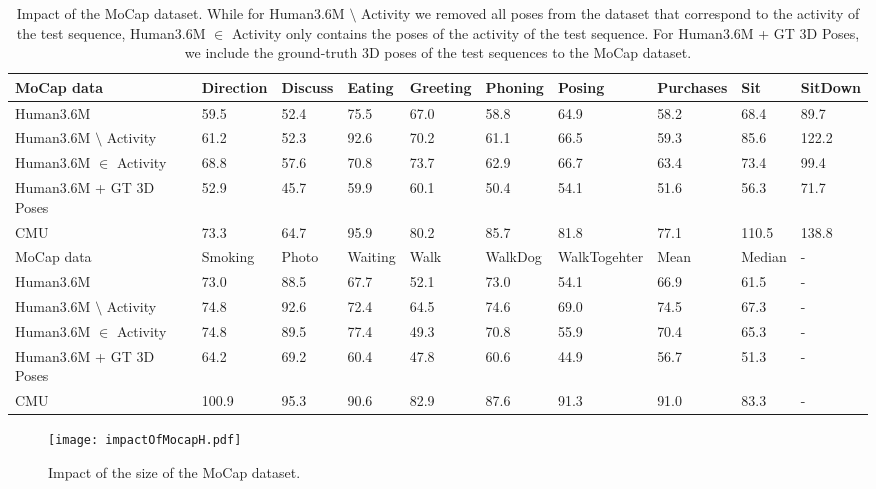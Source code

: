 \documentclass[10pt,journal,compsoc]{IEEEtran}
\begin{document}
\begin{table*}[!]
\centering
\begin{tabularx}{\linewidth}{lsssssssss}
\toprule \midrule
MoCap data 				& Direction		& Discuss		& Eating	& Greeting 		& Phoning 		& Posing		& Purchases 		& Sit 			& SitDown	\\
\midrule \midrule
Human3.6M				& 59.5			&52.4			&75.5		&67.0			&58.8			&64.9			&58.2			&68.4			& 89.7		\\	
Human3.6M  $\setminus$ Activity		& 61.2			&52.3			&92.6		&70.2			&61.1			&66.5			&59.3			&85.6			& 122.2		\\ 
Human3.6M  $\in$ Activity		& 68.8			&57.6			&70.8		&73.7			&62.9			&66.7			&63.4			&73.4			& 99.4		\\ 
Human3.6M + GT 3D Poses			& 52.9			&45.7			&59.9		&60.1			&50.4			&54.1			&51.6			&56.3			& 71.7		\\
CMU					& 73.3			&64.7			&95.9		&80.2			&85.7			&81.8			&77.1			&110.5			& 138.8	 	\\ 
\midrule \midrule
MoCap data  				& Smoking 		& Photo 		& Waiting 	& Walk 			& WalkDog 		& WalkTogehter 		& Mean 			& Median 		& -\\
\midrule
\midrule
Human3.6M				& 73.0			&88.5			&67.7		&52.1			&73.0			&54.1			&66.9			&61.5		 	&-\\
Human3.6M  $\setminus$ Activity 	&74.8			&92.6			&72.4		&64.5			&74.6			&69.0			&74.5			&67.3			&-\\
Human3.6M  $\in$ Activity 		&74.8			&89.5			&77.4		&49.3			&70.8			&55.9			&70.4			&65.3			&-\\
Human3.6M + GT 3D Poses			&64.2			&69.2			&60.4		&47.8			&60.6			&44.9			&56.7			&51.3			&-\\
CMU					&100.9			&95.3			&90.6		&82.9			&87.6			&91.3			&91.0			&83.3			&-\\
\bottomrule
\end{tabularx}
\caption{Impact of the MoCap dataset. While for Human3.6M  $\setminus$ Activity we removed all poses from the dataset that correspond to the activity of the test sequence, Human3.6M  $\in$ Activity only contains the poses of the activity of the test sequence. For Human3.6M + GT 3D Poses, we include the ground-truth 3D poses of the test sequences to the MoCap dataset.}
\label{tab:impactOfMoCap}
\end{table*}

\begin{figure}[t]
\begin{center}
\texttt{[image: impactOfMocapH.pdf]}
\end{center}
   \caption{Impact of the size of the MoCap dataset. }
\label{fig:impactOfMocapH}
\end{figure}
\end{document}
